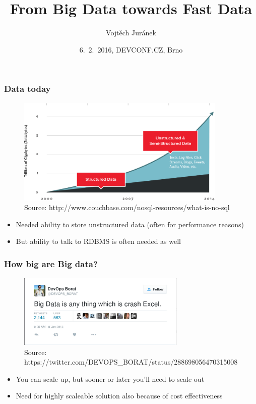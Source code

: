 \documentclass[10pt,utf8]{beamer}
\title{From Big Data towards Fast Data}
\author{Vojtěch Juránek}
\institute[Red Hat]{JBoss - a division by Red Hat}
\date{6.~2.~2016, DEVCONF.CZ, Brno}
\begin{document}
\begin{frame}
 \titlepage
\end{frame}
	
\begin{frame}
	\frametitle{Data today}
	\begin{figure}
		\centering
		\includegraphics[width=10cm]{./img/why-nosql-2.eps}
		\caption{\tiny{Source: http://www.couchbase.com/nosql-resources/what-is-no-sql}}
	\end{figure}
	
	\vspace{-0.5cm}
	\begin{itemize}
		\item Needed ability to store unstructured data (often for performance reasons)
		\item But ability  to talk to RDBMS is often needed as well
	\end{itemize}
\end{frame}

\begin{frame}
	\frametitle{How big are Big data?}
	 {
		\begin{figure}
			\centering
			\includegraphics[width=8cm]{./img/borat_big_data.eps}
			\caption{\tiny{Source: https://twitter.com/DEVOPS\_BORAT/status/288698056470315008}}
		\end{figure}
	}
	 {
		\begin{itemize}
			\item You can scale up, but sooner or later you'll need to scale out
			\item Need for highly scaleable solution also because of cost effectiveness
		\end{itemize}
	}
\end{frame}
\end{document}
